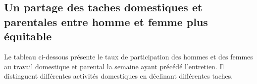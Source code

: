 \documentclass[
  12pt,
]{book}
\begin{document}
\subsection{Un partage des taches domestiques et parentales entre homme
et femme plus
équitable}\label{un-partage-des-taches-domestiques-et-parentales-entre-homme-et-femme-plus-uxe9quitable}

Le tableau ci-dessous présente le taux de participation des hommes et
des femmes au travail domestique et parental la semaine ayant précédé
l'entretien. Il distinguent différentes activités domestiques en
déclinant différentes taches.

\begin{table}[!h]
\centering\centering
\caption{\label{tab:unnamed-chunk-19}Implication dans le travail domestique et parental en fonction de la configuration familiale et du sexe}
\centering
\fontsize{8}{10}\selectfont
{}
\end{table}
\end{document}
